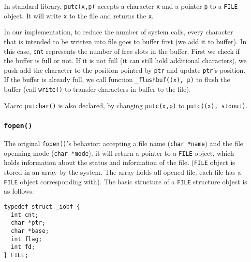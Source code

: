 \documentclass[12pt]{article}
\begin{document}
In standard library, \texttt{putc(x,p)} accepts a character \texttt{x} and a pointer \texttt{p} to a \texttt{FILE} object. It will write \texttt{x} to the file and returns the \texttt{x}.

In our implementation, to reduce the number of system calls, every character that is intended to be written into file goes to buffer first (we add it to buffer). In this case, \texttt{cnt} represents the number of free slots in the buffer. First we check if the buffer is full or not. If it is not full (it can still hold additional characters), we push add the character to the position pointed by \texttt{ptr} and update \texttt{ptr}'s position. If the buffer is already full, we call function \texttt{\_flushbuf((x), p)} to flush the buffer (call \texttt{write()} to transfer characters in buffer to the file).

Macro \texttt{putchar()} is also declared, by changing \texttt{putc(x,p)} to \texttt{putc((x), stdout)}.

\subsubsection{\texttt{fopen()}}
\label{sec:orgde60c84}
The original \texttt{fopen()}'s behavior: accepting a file name (\texttt{char *name}) and the file openning mode (\texttt{char *mode}), it will return a pointer to a \texttt{FILE} object, which holds information about the status and information of the file. (\texttt{FILE} object is stored in an array by the system. The array holds all opened file, each file has a \texttt{FILE} object corresponding with). The basic structure of a \texttt{FILE} structure object is as follows:
\begin{verbatim}
typedef struct _iobf {
  int cnt;
  char *ptr;
  char *base;
  int flag;
  int fd;
} FILE;
\end{verbatim}
\end{document}
